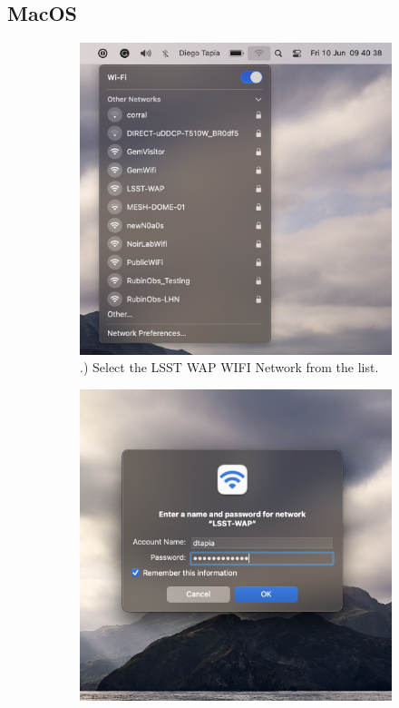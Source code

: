 \newpage
  
  \subsection{MacOS}
  \vspace{20 mm}
  \begin{figure}
    \centering
    \begin{subfigure}{0.40\textwidth}
      \includegraphics[width=\textwidth]{Images/Mac1.png}
      .) Select the LSST WAP WIFI Network from the list.
    \end{subfigure}
      \hfill
    \begin{subfigure}{0.40\textwidth}
      \includegraphics[width=\textwidth]{Images/Mac3.png}

\end{subfigure}
\end{figure}

